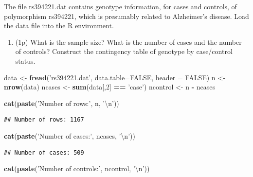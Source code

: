 \documentclass[
]{article}
\newenvironment{Shaded}{\begin{snugshade}}{\end{snugshade}}
\newcommand{\CharTok}[1]{\textcolor[rgb]{0.31,0.60,0.02}{#1}}
\newcommand{\DataTypeTok}[1]{\textcolor[rgb]{0.13,0.29,0.53}{#1}}
\newcommand{\DecValTok}[1]{\textcolor[rgb]{0.00,0.00,0.81}{#1}}
\newcommand{\KeywordTok}[1]{\textcolor[rgb]{0.13,0.29,0.53}{\textbf{#1}}}
\newcommand{\NormalTok}[1]{#1}
\newcommand{\OperatorTok}[1]{\textcolor[rgb]{0.81,0.36,0.00}{\textbf{#1}}}
\newcommand{\OtherTok}[1]{\textcolor[rgb]{0.56,0.35,0.01}{#1}}
\newcommand{\StringTok}[1]{\textcolor[rgb]{0.31,0.60,0.02}{#1}}
\providecommand{\tightlist}{%
  \setlength{\itemsep}{0pt}\setlength{\parskip}{0pt}}
\begin{document}
The file rs394221.dat contains genotype information, for cases and
controls, of polymorphism rs394221, which is presumably related to
Alzheimer's disease. Load the data file into the R environment.

\begin{enumerate}
\def\labelenumi{\arabic{enumi}.}
\tightlist
\item
  (1p) What is the sample size? What is the number of cases and the
  number of controls? Construct the contingency table of genotype by
  case/control status.
\end{enumerate}

\begin{Shaded}
\begin{Highlighting}[]
\NormalTok{data <-}\StringTok{ }\KeywordTok{fread}\NormalTok{(}\StringTok{'rs394221.dat'}\NormalTok{, }\DataTypeTok{data.table=}\OtherTok{FALSE}\NormalTok{, }\DataTypeTok{header =} \OtherTok{FALSE}\NormalTok{)}
\NormalTok{n <-}\StringTok{ }\KeywordTok{nrow}\NormalTok{(data)}
\NormalTok{ncases <-}\StringTok{ }\KeywordTok{sum}\NormalTok{(data[,}\DecValTok{2}\NormalTok{] }\OperatorTok{==}\StringTok{ 'case'}\NormalTok{)}
\NormalTok{ncontrol <-}\StringTok{ }\NormalTok{n }\OperatorTok{-}\StringTok{ }\NormalTok{ncases}

\KeywordTok{cat}\NormalTok{(}\KeywordTok{paste}\NormalTok{(}\StringTok{'Number of rows:'}\NormalTok{, n, }\StringTok{'}\CharTok{\textbackslash{}n}\StringTok{'}\NormalTok{))}
\end{Highlighting}
\end{Shaded}

\begin{verbatim}
## Number of rows: 1167
\end{verbatim}

\begin{Shaded}
\begin{Highlighting}[]
\KeywordTok{cat}\NormalTok{(}\KeywordTok{paste}\NormalTok{(}\StringTok{'Number of cases:'}\NormalTok{, ncases, }\StringTok{'}\CharTok{\textbackslash{}n}\StringTok{'}\NormalTok{))}
\end{Highlighting}
\end{Shaded}

\begin{verbatim}
## Number of cases: 509
\end{verbatim}

\begin{Shaded}
\begin{Highlighting}[]
\KeywordTok{cat}\NormalTok{(}\KeywordTok{paste}\NormalTok{(}\StringTok{'Number of controls:'}\NormalTok{, ncontrol, }\StringTok{'}\CharTok{\textbackslash{}n}\StringTok{'}\NormalTok{))}
\end{Highlighting}
\end{Shaded}
\end{document}
